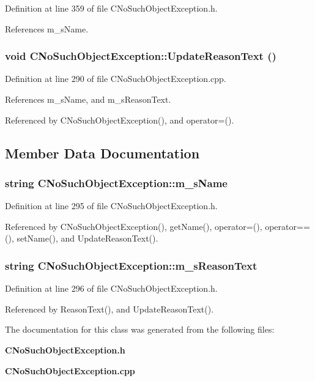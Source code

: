 Definition at line 359 of file CNo\-Such\-Object\-Exception.h.

References m\_\-s\-Name.
\subsubsection{\setlength{\rightskip}{0pt plus 5cm}void CNo\-Such\-Object\-Exception::Update\-Reason\-Text ()\hspace{0.3cm}{\tt  [protected]}}\label{classCNoSuchObjectException_b0}




Definition at line 290 of file CNo\-Such\-Object\-Exception.cpp.

References m\_\-s\-Name, and m\_\-s\-Reason\-Text.

Referenced by CNo\-Such\-Object\-Exception(), and operator=().

\subsection{Member Data Documentation}
\subsubsection{\setlength{\rightskip}{0pt plus 5cm}string CNo\-Such\-Object\-Exception::m\_\-s\-Name\hspace{0.3cm}{\tt  [private]}}\label{classCNoSuchObjectException_o0}




Definition at line 295 of file CNo\-Such\-Object\-Exception.h.

Referenced by CNo\-Such\-Object\-Exception(), get\-Name(), operator=(), operator==(), set\-Name(), and Update\-Reason\-Text().
\subsubsection{\setlength{\rightskip}{0pt plus 5cm}string CNo\-Such\-Object\-Exception::m\_\-s\-Reason\-Text\hspace{0.3cm}{\tt  [private]}}\label{classCNoSuchObjectException_o1}




Definition at line 296 of file CNo\-Such\-Object\-Exception.h.

Referenced by Reason\-Text(), and Update\-Reason\-Text().

The documentation for this class was generated from the following files:\begin{CompactItemize}
\item 
{\bf CNo\-Such\-Object\-Exception.h}\item 
{\bf CNo\-Such\-Object\-Exception.cpp}\end{CompactItemize}
